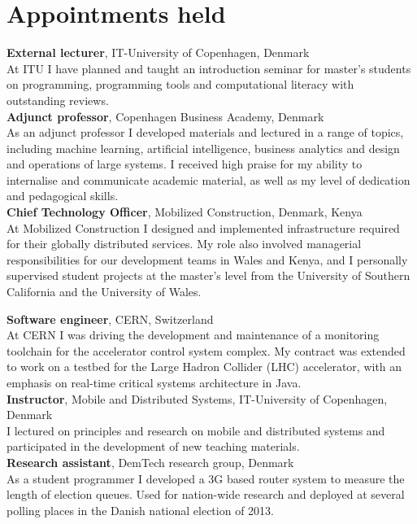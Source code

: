 \documentclass[11pt, a4paper]{article}
\newcommand{\years}[1]{\marginnote{\scriptsize #1}}
\begin{document}
\section*{Appointments held}
\noindent
\years{2018-}\textbf{External lecturer}, IT-University of Copenhagen, Denmark\\
At ITU I have planned and taught an introduction seminar for master's students
on programming, programming tools and computational literacy with outstanding reviews. \\[0.5cm]
\years{2016-}\textbf{Adjunct professor}, Copenhagen Business Academy,
Denmark\\
As an adjunct professor I developed materials and lectured in
a range of topics, including machine learning, artificial intelligence, business
analytics and design and operations of large systems.
I received high praise for my ability to internalise and communicate academic
material, as well as my level of dedication and pedagogical skills.\\[0.5cm]
\years{2016-}\textbf{Chief Technology Officer}, Mobilized Construction, Denmark, Kenya\\
At Mobilized Construction I designed and implemented infrastructure required for
their globally distributed services.
My role also involved managerial responsibilities for our development teams in 
Wales and Kenya, and I personally supervised student
projects at the master's level from the University of Southern
California and the University of Wales.\\[0.5cm]
\pagebreak

\years{2014-2016}\textbf{Software engineer}, CERN, Switzerland\\
At CERN I was driving the development and maintenance of
a monitoring toolchain for the accelerator control system complex.
My contract was extended to work on a testbed for the Large Hadron
Collider (LHC) accelerator, with an emphasis on real-time critical
systems architecture in Java. \\[0.5cm]
\years{2013}\textbf{Instructor}, Mobile and Distributed Systems, IT-University of
Copenhagen, Denmark\\
I lectured on principles and research on mobile and distributed
systems and participated in the development of new teaching
materials. \\[0.5cm]
\years{2012-2014}\textbf{Research assistant}, DemTech research group, Denmark\\
As a student programmer I developed a 3G based router system to
measure the length of election queues. Used for nation-wide
research and deployed at several polling places in the Danish national
election of 2013.
\end{document}
